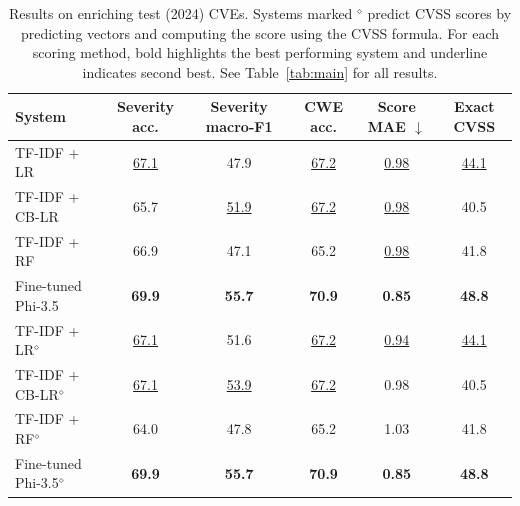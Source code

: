 \begin{table}[t]
\centering
\caption{Results on enriching test (2024) CVEs. Systems marked $^{\diamond}$ predict CVSS scores by predicting vectors and computing the score using the CVSS formula. For each scoring method, bold highlights the best performing system and underline indicates second best. See Table~\ref{tab:main} for all results.}
\label{tab:summary}
\small
\setlength{\tabcolsep}{4pt}
\begin{tabular}{lccccc}
\toprule
System & Severity acc. & Severity macro-F1 & CWE acc. & Score MAE $\downarrow$ & Exact CVSS \\
\midrule
TF-IDF + LR & \underline{67.1} & 47.9 & \underline{67.2} & \underline{0.98} & \underline{44.1} \\
TF-IDF + CB-LR & 65.7 & \underline{51.9} & \underline{67.2} & \underline{0.98} & 40.5 \\
TF-IDF + RF & 66.9 & 47.1 & 65.2 & \underline{0.98} & 41.8 \\
Fine-tuned Phi-3.5 & \textbf{69.9} & \textbf{55.7} & \textbf{70.9} & \textbf{0.85} & \textbf{48.8} \\
\midrule
TF-IDF + LR$^{\diamond}$ & \underline{67.1} & 51.6 & \underline{67.2} & \underline{0.94} & \underline{44.1} \\
TF-IDF + CB-LR$^{\diamond}$ & \underline{67.1} & \underline{53.9} & \underline{67.2} & 0.98 & 40.5 \\
TF-IDF + RF$^{\diamond}$ & 64.0 & 47.8 & 65.2 & 1.03 & 41.8 \\
Fine-tuned Phi-3.5$^{\diamond}$ & \textbf{69.9} & \textbf{55.7} & \textbf{70.9} & \textbf{0.85} & \textbf{48.8} \\
\bottomrule
\end{tabular}
\end{table}
